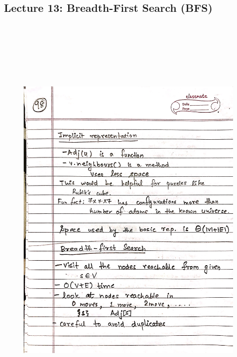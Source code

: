 \newpage
{\color{black} \subsection*{Lecture 13: Breadth-First Search (BFS)}}
\begin{figure}[H]
    \centering
    \includegraphics[width=16cm, height=21cm]{"./MIT-6.006/MIT-6006-098"}
\end{figure}

